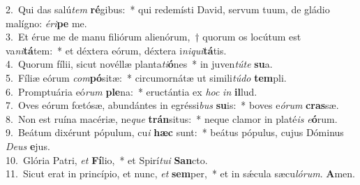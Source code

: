 {2.~}Qui das salú\textit{tem} \textbf{ré}gibus:~* qui redemísti David, servum tuum, de gládio malígno: \textit{é}\textit{ri}\textbf{pe} me.\\
{3.~}Et érue me de manu filiórum alienórum,~† quorum os locútum est va\textit{ni}\textbf{tá}tem:~* et déxtera eórum, déxtera i\textit{ni}\textit{qui}\textbf{tá}tis.\\
{4.~}Quorum fílii, sicut novéllæ planta\textit{ti}\textbf{ó}nes~* in juven\textit{tú}\textit{te} \textbf{su}a.\\
{5.~}Fíliæ eórum \textit{com}\textbf{pó}sitæ:~* circumornátæ ut simili\textit{tú}\textit{do} \textbf{tem}pli.\\
{6.~}Promptuária eó\textit{rum} \textbf{ple}na:~* eructántia ex \textit{hoc} \textit{in} \textbf{il}lud.\\
{7.~}Oves eórum fœtósæ, abundántes in egréssi\textit{bus} \textbf{su}is:~* boves e\textit{ó}\textit{rum} \textbf{cras}sæ.\\
{8.~}Non est ruína macériæ, ne\textit{que} \textbf{trán}situs:~* neque clamor in platé\textit{is} \textit{e}\textbf{ó}rum.\\
{9.~}Beátum dixérunt pópulum, cu\textit{i} \textbf{hæc} sunt:~* beátus pópulus, cujus Dóminus \textit{De}\textit{us} \textbf{e}jus.\\
{10.~}Glória Patri, \textit{et} \textbf{Fí}lio,~* et Spirí\textit{tu}\textit{i} \textbf{San}cto.\\
{11.~}Sicut erat in princípio, et nunc, \textit{et} \textbf{sem}per,~* et in sǽcula sæcu\textit{ló}\textit{rum}. \textbf{A}men.\\
